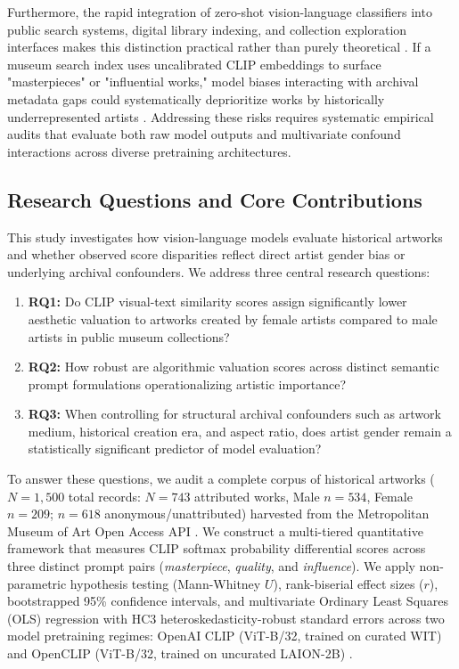 \documentclass[pdflatex,sn-mathphys-num]{sn-jnl}%
\theoremstyle{thmstyleone}%
\theoremstyle{thmstyletwo}%
\theoremstyle{thmstylethree}%
\begin{document}
Furthermore, the rapid integration of zero-shot vision-language classifiers into public search systems, digital library indexing, and collection exploration interfaces makes this distinction practical rather than purely theoretical \cite{srinivasan2021arts, luccioni2023stable}. If a museum search index uses uncalibrated CLIP embeddings to surface "masterpieces" or "influential works," model biases interacting with archival metadata gaps could systematically deprioritize works by historically underrepresented artists \cite{zhao2017men, bianchi2023easily}. Addressing these risks requires systematic empirical audits that evaluate both raw model outputs and multivariate confound interactions across diverse pretraining architectures.

\subsection{Research Questions and Core Contributions}
This study investigates how vision-language models evaluate historical artworks and whether observed score disparities reflect direct artist gender bias or underlying archival confounders. We address three central research questions:
\begin{enumerate}
    \item \textbf{RQ1:} Do CLIP visual-text similarity scores assign significantly lower aesthetic valuation to artworks created by female artists compared to male artists in public museum collections?
    \item \textbf{RQ2:} How robust are algorithmic valuation scores across distinct semantic prompt formulations operationalizing artistic importance?
    \item \textbf{RQ3:} When controlling for structural archival confounders such as artwork medium, historical creation era, and aspect ratio, does artist gender remain a statistically significant predictor of model evaluation?
\end{enumerate}

To answer these questions, we audit a complete corpus of historical artworks ($N = 1,500$ total records: $N = 743$ attributed works, Male $n = 534$, Female $n = 209$; $n = 618$ anonymous/unattributed) harvested from the Metropolitan Museum of Art Open Access API \cite{met_api_2023, garcia2020bias}. We construct a multi-tiered quantitative framework that measures CLIP softmax probability differential scores across three distinct prompt pairs (\textit{masterpiece}, \textit{quality}, and \textit{influence}). We apply non-parametric hypothesis testing (Mann-Whitney $U$), rank-biserial effect sizes ($r$), bootstrapped 95\% confidence intervals, and multivariate Ordinary Least Squares (OLS) regression with HC3 heteroskedasticity-robust standard errors across two model pretraining regimes: OpenAI CLIP (ViT-B/32, trained on curated WIT) and OpenCLIP (ViT-B/32, trained on uncurated LAION-2B) \cite{cherti2023reproducible, schuhmann2022laion}.
\end{document}
